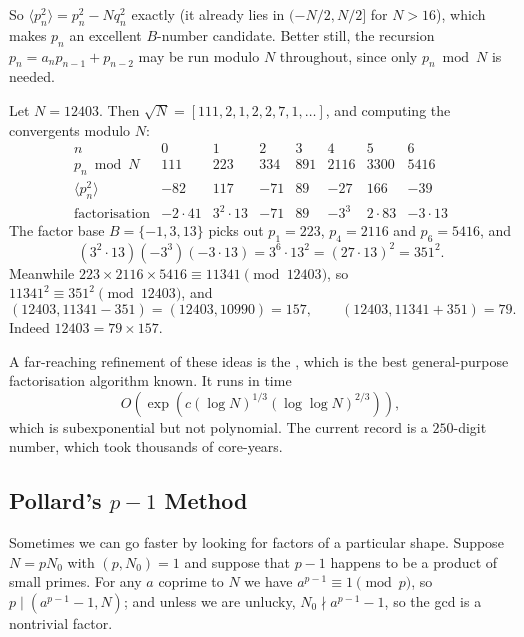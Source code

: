 \documentclass[a4paper]{scrartcl}
\begin{document}
So $\langle p_n^2\rangle = p_n^2 - Nq_n^2$ exactly (it already lies in $(-N/2, N/2]$ for $N > 16$), which makes $p_n$ an excellent $B$-number candidate. Better still, the recursion $p_n = a_np_{n-1}+p_{n-2}$ may be run modulo $N$ throughout, since only $p_n \bmod N$ is needed.

\begin{example}
	Let $N = 12403$. Then $\sqrt N = [111, 2, 1, 2, 2, 7, 1, \dots]$, and computing the convergents modulo $N$:
	$$
	\begin{array}{c|ccccccc}
		n & 0 & 1 & 2 & 3 & 4 & 5 & 6 \\ \hline
		p_n \bmod N & 111 & 223 & 334 & 891 & 2116 & 3300 & 5416 \\
		\langle p_n^2\rangle & -82 & 117 & -71 & 89 & -27 & 166 & -39 \\
		\text{factorisation} & -2\cdot41 & 3^2\cdot13 & -71 & 89 & -3^3 & 2\cdot83 & -3\cdot13
	\end{array}
	$$
	The factor base $B = \{-1, 3, 13\}$ picks out $p_1 = 223$, $p_4 = 2116$ and $p_6 = 5416$, and
	$$
	(3^2\cdot13)(-3^3)(-3\cdot13) = 3^6\cdot13^2 = (27\cdot13)^2 = 351^2.
	$$
	Meanwhile $223\times2116\times5416 \equiv 11341 \pmod{12403}$, so $11341^2 \equiv 351^2 \pmod{12403}$, and
	$$
	(12403, 11341 - 351) = (12403, 10990) = 157, \qquad (12403, 11341+351) = 79.
	$$
	Indeed $12403 = 79\times157$.
\end{example}

\begin{remark}
	A far-reaching refinement of these ideas is the , which is the best general-purpose factorisation algorithm known. It runs in time
	$$
	O\!\left(\exp\left(c(\log N)^{1/3}(\log\log N)^{2/3}\right)\right),
	$$
	which is subexponential but not polynomial. The current record is a $250$-digit number, which took thousands of core-years.
\end{remark}

\subsection{Pollard's $p - 1$ Method}

Sometimes we can go faster by looking for factors of a particular shape. Suppose $N = pN_0$ with $(p, N_0) = 1$ and suppose that $p - 1$ happens to be a product of small primes. For any $a$ coprime to $N$ we have $a^{p-1}\equiv 1 \pmod p$, so $p \mid (a^{p-1}-1, N)$; and unless we are unlucky, $N_0 \nmid a^{p-1}-1$, so the gcd is a nontrivial factor.
\end{document}
